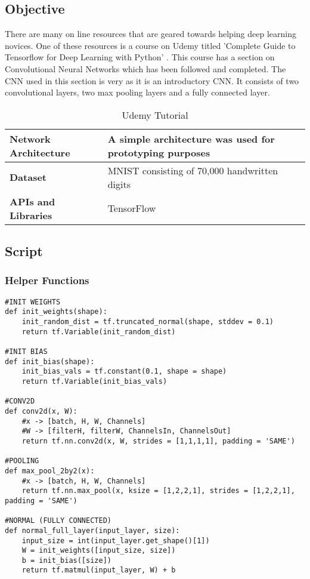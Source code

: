 \subsection*{Objective}
There are many on line resources that are geared towards helping deep learning novices.
One of these resources is a course on Udemy titled 'Complete Guide to Tensorflow for Deep Learning with Python' \parencite{udemy}.
This course has a section on Convolutional Neural Networks which has been followed and completed.
The CNN used in this section is very  as it is an introductory CNN.
It consists of two convolutional layers, two max pooling layers and a fully connected layer.

\begin{table}[h]
\centering
\caption{Udemy Tutorial}
\label{my-label}
\begin{tabular}{|l|p{9cm}|}
\hline
\textbf{Network Architecture} & A simple architecture was used for prototyping purposes            \\ \hline
\textbf{Dataset}              & MNIST  consisting of 70,000 handwritten digits \parencite{mnist} \\ \hline
\textbf{APIs and Libraries}   & TensorFlow                                                         \\ \hline
\end{tabular}
\end{table}

\subsection*{Script}
\subsubsection*{Helper Functions}
\begin{lstlisting}[style=Python]
#INIT WEIGHTS
def init_weights(shape):
    init_random_dist = tf.truncated_normal(shape, stddev = 0.1)
    return tf.Variable(init_random_dist)

#INIT BIAS
def init_bias(shape):
    init_bias_vals = tf.constant(0.1, shape = shape)
    return tf.Variable(init_bias_vals)

#CONV2D
def conv2d(x, W):
    #x -> [batch, H, W, Channels]
    #W -> [filterH, filterW, ChannelsIn, ChannelsOut]
    return tf.nn.conv2d(x, W, strides = [1,1,1,1], padding = 'SAME')

#POOLING
def max_pool_2by2(x):
    #x -> [batch, H, W, Channels]
    return tf.nn.max_pool(x, ksize = [1,2,2,1], strides = [1,2,2,1], padding = 'SAME')

#NORMAL (FULLY CONNECTED)
def normal_full_layer(input_layer, size):
    input_size = int(input_layer.get_shape()[1])
    W = init_weights([input_size, size])
    b = init_bias([size])
    return tf.matmul(input_layer, W) + b
\end{lstlisting}

